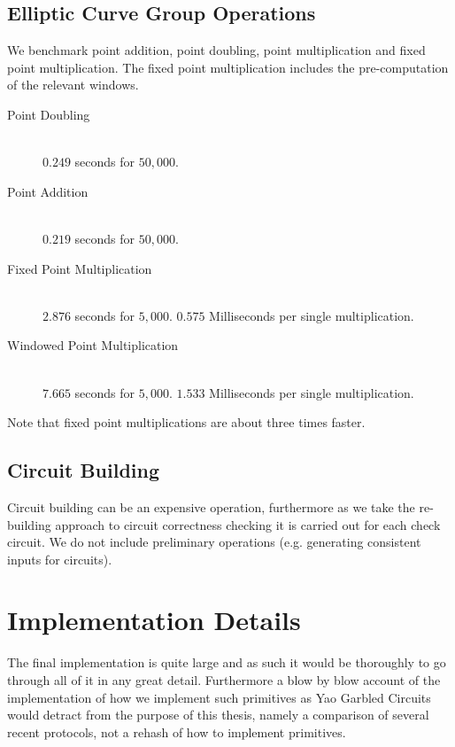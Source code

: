 \documentclass[ %
                    author={Nicholas Tutte},
                supervisor={Prof. Nigel Smart},
                    degree={MEng},
                     title={Secure Two Party Computation},
                  subtitle={A practical comparison of recent protocols},
                      type={Research - GG1K},
                      year={2015} ]{dissertation}
\begin{document}
\begin{appendices}
			\pagebreak
			\section{Elliptic Curve Group Operations}

				We benchmark point addition, point doubling, point multiplication and fixed point multiplication. The fixed point multiplication includes the pre-computation of the relevant windows.


				\begin{description}
					\item[Point Doubling] \hfill \\
						$0.249$ seconds for $50,000$.

					\item[Point Addition] \hfill \\
						$0.219$ seconds for $50,000$.

					\item[Fixed Point Multiplication] \hfill \\
						$2.876$ seconds for $5,000$. $0.575$ Milliseconds per single multiplication.

					\item[Windowed Point Multiplication] \hfill \\
						$7.665$ seconds for $5,000$. $1.533$ Milliseconds per single multiplication.
				\end{description}

				Note that fixed point multiplications are about three times faster.


			\section{Circuit Building}

				Circuit building can be an expensive operation, furthermore as we take the re-building approach to circuit correctness checking it is carried out for each check circuit. We do not include preliminary operations (e.g. generating consistent inputs for circuits).

			


		\chapter{Implementation Details} \label{sec:ImplementationDetails}
			The final implementation is quite large and as such it would be thoroughly to go through all of it in any great detail. Furthermore a blow by blow account of the implementation of how we implement such primitives as Yao Garbled Circuits would detract from the purpose of this thesis, namely a comparison of several recent protocols, not a rehash of how to implement primitives.\\


\end{appendices}
\end{document}
